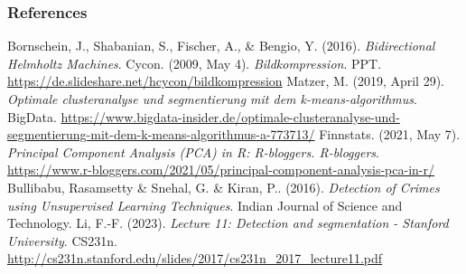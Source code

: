 \begin{vbframe}
\frametitle{References}
\footnotesize{
\begin{thebibliography}{99}
 Bornschein, J., Shabanian, S., Fischer, A., \& Bengio, Y. (2016). \textit{Bidirectional Helmholtz Machines}.
 Cycon. (2009, May 4). \textit{Bildkompression}. PPT. \url{https://de.slideshare.net/hcycon/bildkompression} 
 Matzer, M. (2019, April 29). \textit{Optimale clusteranalyse und segmentierung mit dem k-means-algorithmus}. BigData. \url{https://www.bigdata-insider.de/optimale-clusteranalyse-und-segmentierung-mit-dem-k-means-algorithmus-a-773713/}
 Finnstats. (2021, May 7). \textit{Principal Component Analysis (PCA) in R: R-bloggers. R-bloggers}. \url{https://www.r-bloggers.com/2021/05/principal-component-analysis-pca-in-r/} 
 Bullibabu, Rasamsetty \& Snehal, G. \& Kiran, P.. (2016). \textit{Detection of Crimes using Unsupervised Learning Techniques}. Indian Journal of Science and Technology. 
 Li, F.-F. (2023). \textit{Lecture 11: Detection and segmentation - Stanford University}. CS231n. \url{http://cs231n.stanford.edu/slides/2017/cs231n_2017_lecture11.pdf}

\end{thebibliography}
}
\end{vbframe}



\endlecture

